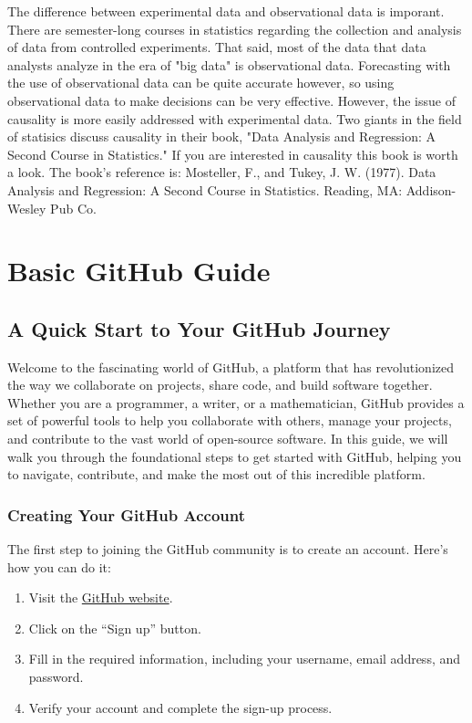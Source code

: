 \documentclass[a4paper,12pt]{book}
\begin{document}
The difference between experimental data and observational data is imporant. There are semester-long courses in statistics regarding the collection and analysis of data from controlled experiments. That said, most of the data that data analysts analyze in the era of "big data" is observational data. Forecasting with the use of observational data can be quite accurate however, so using observational data to make decisions can be very effective. However, the issue of causality is more easily addressed with experimental data. Two giants in the field of statisics discuss causality in their book, "Data Analysis and Regression: A Second Course in Statistics." If you are interested in causality this book is worth a look. The book's reference is: Mosteller, F., and Tukey, J. W. (1977). Data Analysis and Regression: A Second Course in Statistics. Reading, MA: Addison-Wesley Pub Co.

\clearpage
{}
\appendix
\renewcommand{\thechapter}{\Roman{chapter}} %

\chapter{Basic GitHub Guide}
\section*{A Quick Start to Your GitHub Journey}

Welcome to the fascinating world of GitHub, a platform that has revolutionized the way we collaborate on projects, share code, and build software together. Whether you are a programmer, a writer, or a mathematician, GitHub provides a set of powerful tools to help you collaborate with others, manage your projects, and contribute to the vast world of open-source software. In this guide, we will walk you through the foundational steps to get started with GitHub, helping you to navigate, contribute, and make the most out of this incredible platform.

\subsection*{Creating Your GitHub Account}

The first step to joining the GitHub community is to create an account. Here’s how you can do it:

\begin{enumerate}
    \item Visit the \href{https://github.com/}{GitHub website}.
    \item Click on the “Sign up” button.
    \item Fill in the required information, including your username, email address, and password.
    \item Verify your account and complete the sign-up process.
\end{enumerate}
\end{document}

